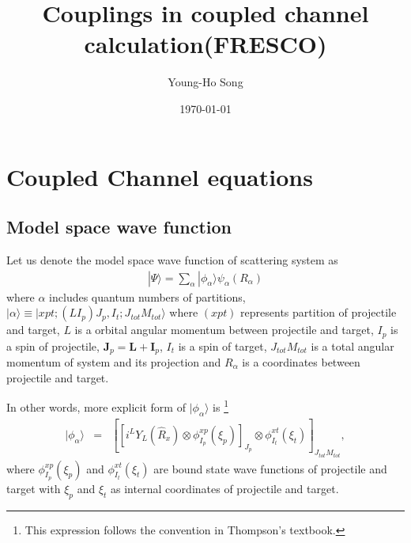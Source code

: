 \documentclass[11pt]{book}
\title{Couplings in coupled channel calculation(FRESCO)}
\author{Young-Ho Song}
\date{\today}
\def\bm{\boldsymbol}
\def\ra{\rangle}
\newcommand{\bea}{\begin{eqnarray}}
\newcommand{\eea}{\end{eqnarray}}
\begin{document}
\maketitle
\tableofcontents
\newpage

\chapter{Coupled Channel equations} 

\section{Model space wave function}
Let us denote the model space wave function of scattering system as
\bea 
|\Psi\ra =\sum_\alpha |\phi_\alpha\ra \psi_\alpha(R_\alpha)
\eea 
where $\alpha$ includes quantum numbers of partitions,
$|\alpha\ra\equiv |x p t; (L I_p)J_p ,I_t; J_{tot} M_{tot}\ra $
where $(x p t)$ represents partition of projectile and target, $L$ is a orbital angular momentum 
between projectile and target, $I_p$ is a spin of projectile, ${\bm J}_p={\bm L}+{\bm I}_p$,
$I_t$ is a spin of target, $J_{tot} M_{tot}$ is a total angular momentum of system and its projection
and $R_\alpha$ is a coordinates between projectile and target.

In other words, more explicit form of $|\phi_\alpha\ra$ is
\footnote{This expression follows the convention in Thompson's textbook.}    
\bea 
|\phi_\alpha\ra &=&  \left[ \left[i^{L} Y_{L}(\hat{R}_x)\otimes \phi^{xp}_{I_p}(\xi_p)\right]_{J_p} 
\otimes \phi^{xt}_{I_t}(\xi_t)\right]_{J_{tot}M_{tot}},
\eea 
where $\phi^{xp}_{I_p}(\xi_p)$ and $\phi^{xt}_{I_t}(\xi_t)$ are bound state wave functions of 
projectile and target with $\xi_p$ and $\xi_t$ as internal coordinates of projectile and target.
\end{document}
